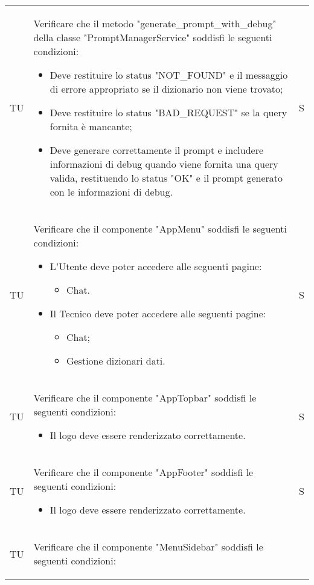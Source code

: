 \begin{adjustwidth}{-0.5cm}{-0.5cm}
\begin{longtable}{|P{1.5cm}|>{\raggedright}P{9.5cm}|>{\arraybackslash}P{1.5cm}|}
		\hline TU & Verificare che il metodo "generate_prompt_with_debug" della classe "PromptManagerService" soddisfi le seguenti condizioni:
		\begin{itemize}
			\item Deve restituire lo status "NOT_FOUND" e il messaggio di errore appropriato se il dizionario non viene trovato;
			\item Deve restituire lo status "BAD_REQUEST" se la query fornita è mancante;
			\item Deve generare correttamente il prompt e includere informazioni di debug quando viene fornita una query valida, restituendo lo status "OK" e il prompt generato con le informazioni di debug.
		\end{itemize} & S \\

    TU & Verificare che il componente "AppMenu" soddisfi le seguenti condizioni:
    \begin{itemize}
      \item L'Utente deve poter accedere alle seguenti pagine:
      \begin{itemize}
        \item Chat.
      \end{itemize}
      \item Il Tecnico deve poter accedere alle seguenti pagine:
      \begin{itemize}
        \item Chat;
        \item Gestione dizionari dati.
      \end{itemize}
    \end{itemize} & S \\
    \hline TU & Verificare che il componente "AppTopbar" soddisfi le seguenti condizioni:
    \begin{itemize}
      \item Il logo deve essere renderizzato correttamente.
    \end{itemize} & S \\
    \hline TU & Verificare che il componente "AppFooter" soddisfi le seguenti condizioni:
    \begin{itemize}
      \item Il logo deve essere renderizzato correttamente.
    \end{itemize} & S \\
    \hline TU & Verificare che il componente "MenuSidebar" soddisfi le seguenti condizioni:
    \begin{itemize}

\end{itemize}
\end{longtable}
\end{adjustwidth}
